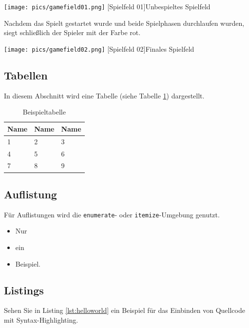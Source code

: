 \documentclass[12pt,a4paper,bibliography=totoc,listof=totoc]{scrartcl}
\begin{document}
\vspace{1em}
\begin{minipage}{\linewidth}
	\centering
	\texttt{[image: pics/gamefield01.png]}
	[Spielfeld 01]{Unbespieltes Spielfeld}
	\label{fig:reversi01}
\end{minipage}


Nachdem das Spielt gestartet wurde und beide Spielphasen durchlaufen wurden, siegt schließlich der Spieler mit der Farbe rot.

\vspace{1em}
\begin{minipage}{\linewidth}
	\centering
	\texttt{[image: pics/gamefield02.png]}
	[Spielfeld 02]{Finales Spielfeld}
	\label{fig:reversi2}
\end{minipage}


\subsection{Tabellen}
In diesem Abschnitt wird eine Tabelle (siehe Tabelle \ref{tab:beispiel}) dargestellt.

\vspace{1em}
\begin{table}[!h]
	\centering
	\begin{tabular}{|l|l|l|}
		\hline
		\textbf{Name} & \textbf{Name} & \textbf{Name}\\
		\hline
		1 & 2 & 3\\
		\hline
		4 & 5 & 6\\
		\hline
		7 & 8 & 9\\
		\hline
	\end{tabular}
	\caption{Beispieltabelle}
	\label{tab:beispiel}
\end{table}


\subsection{Auflistung}
Für Auflistungen wird die \texttt{enumerate}- oder \texttt{itemize}-Umgebung genutzt.

\begin{itemize}
	\item Nur
	\item ein
	\item Beispiel.
\end{itemize}

\subsection{Listings}
Sehen Sie in Listing \ref{lst:helloworld} ein Beispiel für das Einbinden von Quellcode mit Syntax-Highlighting.
\end{document}
